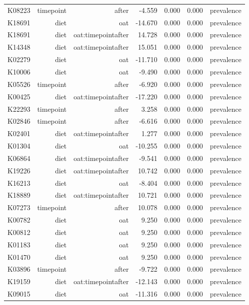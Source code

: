 \documentclass[
]{article}
\begin{document}
\begin{longtable}[t]{lrrrrrr}
K08223 & timepoint & after & -4.559 & 0.000 & 0.000 & prevalence\\
K18691 & diet & oat & -14.670 & 0.000 & 0.000 & prevalence\\
K18691 & diet & oat:timepointafter & 14.728 & 0.000 & 0.000 & prevalence\\
\addlinespace
K14348 & diet & oat:timepointafter & 15.051 & 0.000 & 0.000 & prevalence\\
K02279 & diet & oat & -11.710 & 0.000 & 0.000 & prevalence\\
K10006 & diet & oat & -9.490 & 0.000 & 0.000 & prevalence\\
K05526 & timepoint & after & -6.920 & 0.000 & 0.000 & prevalence\\
K00425 & diet & oat:timepointafter & -17.220 & 0.000 & 0.000 & prevalence\\
\addlinespace
K22293 & timepoint & after & 3.258 & 0.000 & 0.000 & prevalence\\
K02846 & timepoint & after & -6.616 & 0.000 & 0.000 & prevalence\\
K02401 & diet & oat:timepointafter & 1.277 & 0.000 & 0.000 & prevalence\\
K01304 & diet & oat & -10.255 & 0.000 & 0.000 & prevalence\\
K06864 & diet & oat:timepointafter & -9.541 & 0.000 & 0.000 & prevalence\\
\addlinespace
K19226 & diet & oat:timepointafter & 10.742 & 0.000 & 0.000 & prevalence\\
K16213 & diet & oat & -8.404 & 0.000 & 0.000 & prevalence\\
K18889 & diet & oat:timepointafter & 10.721 & 0.000 & 0.000 & prevalence\\
K07273 & timepoint & after & 10.078 & 0.000 & 0.000 & prevalence\\
K00782 & diet & oat & 9.250 & 0.000 & 0.000 & prevalence\\
\addlinespace
K00812 & diet & oat & 9.250 & 0.000 & 0.000 & prevalence\\
K01183 & diet & oat & 9.250 & 0.000 & 0.000 & prevalence\\
K01470 & diet & oat & 9.250 & 0.000 & 0.000 & prevalence\\
K03896 & timepoint & after & -9.722 & 0.000 & 0.000 & prevalence\\
K19159 & diet & oat:timepointafter & -12.143 & 0.000 & 0.000 & prevalence\\
\addlinespace
K09015 & diet & oat & -11.316 & 0.000 & 0.000 & prevalence\\

\end{longtable}
\end{document}
